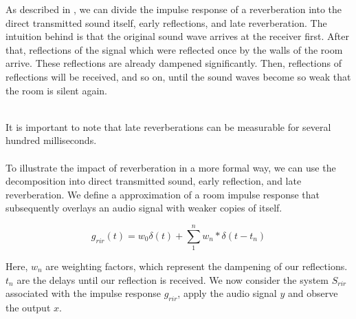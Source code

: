 As described in \cite{yoshioka2012making}, we can divide the impulse response of a reverberation into the direct transmitted sound itself, early reflections, and late reverberation. The intuition behind is that the original sound wave arrives at the receiver first. After that, reflections of the signal which were reflected once by the walls of the room arrive. These reflections are already dampened significantly. Then, reflections of reflections will be received, and so on, until the sound waves become so weak that the room is silent again. 
\\ \\
\begin{minipage}{\linewidth}
	\label{fig:air_rir}
\end{minipage}

It is important to note that late reverberations can be measurable for several hundred milliseconds.\\\\

To illustrate the impact of reverberation in a more formal way, we can use the decomposition into direct transmitted sound, early reflection, and late reverberation. We define a approximation of a room impulse response that subsequently overlays an audio signal with weaker copies of itself.

\[
g_{rir}(t) = w_0 \delta(t) + \sum_{1}^{n} w_n * \delta(t - t_n)
\]

Here, $w_n$ are weighting factors, which represent the dampening of our reflections. $t_n$ are the delays until our reflection is received. We now consider the system $S_{rir}$ associated with the impulse response $g_{rir}$, apply the audio signal $y$ and observe the output $x$.

